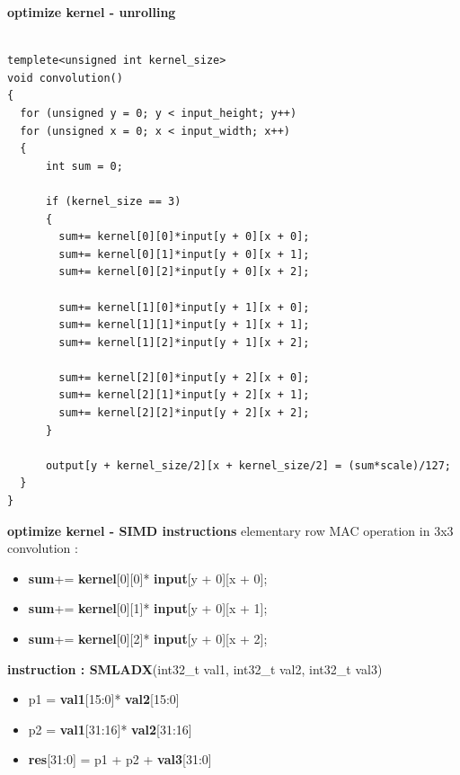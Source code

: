 \documentclass[xcolor=dvipsnames]{beamer}
\begin{document}
\begin{frame}[fragile]
{\bf optimize kernel - unrolling}


\begin{lstlisting}

templete<unsigned int kernel_size>
void convolution()
{
  for (unsigned y = 0; y < input_height; y++)
  for (unsigned x = 0; x < input_width; x++)
  {
      int sum = 0;

      if (kernel_size == 3)
      {
        sum+= kernel[0][0]*input[y + 0][x + 0];
        sum+= kernel[0][1]*input[y + 0][x + 1];
        sum+= kernel[0][2]*input[y + 0][x + 2];

        sum+= kernel[1][0]*input[y + 1][x + 0];
        sum+= kernel[1][1]*input[y + 1][x + 1];
        sum+= kernel[1][2]*input[y + 1][x + 2];

        sum+= kernel[2][0]*input[y + 2][x + 0];
        sum+= kernel[2][1]*input[y + 2][x + 1];
        sum+= kernel[2][2]*input[y + 2][x + 2];
      }

      output[y + kernel_size/2][x + kernel_size/2] = (sum*scale)/127;
  }
}
\end{lstlisting}

\end{frame}


\begin{frame}{\bf optimize kernel - SIMD instructions}
elementary row MAC operation in 3x3 convolution : 

{ \small
  \begin{itemize}
    \item {\bf \color{green} sum}+= {\bf \color{red} kernel}[0][0]*{\bf \color{blue} input}[y + 0][x + 0];
    \item {\bf \color{green} sum}+= {\bf \color{red} kernel}[0][1]*{\bf \color{blue} input}[y + 0][x + 1];
    \item {\bf \color{green} sum}+= {\bf \color{red} kernel}[0][2]*{\bf \color{blue} input}[y + 0][x + 2];
  \end{itemize}
}

{\bf instruction : SMLADX}(int32\_t val1, int32\_t val2, int32\_t val3)
\begin{itemize}
  \item p1 = {\bf \color{red} val1}[15:0]*{\bf \color{blue} val2}[15:0]
  \item p2 = {\bf \color{red} val1}[31:16]*{\bf \color{blue} val2}[31:16]
  \item {\bf \color{green} res}[31:0] = p1 + p2 + {\bf \color{green} val3}[31:0]
\end{itemize}


\end{frame}
\end{document}
